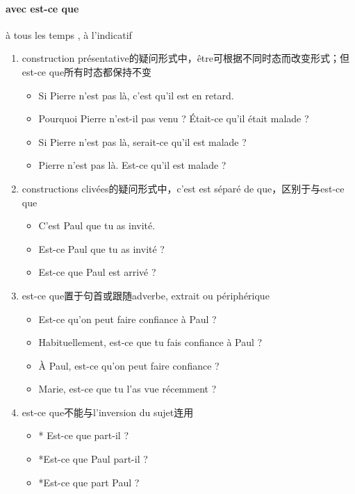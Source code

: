 \documentclass[UTF8]{report}
\begin{document}
\paragraph{avec est-ce que}
à tous les temps , à l’indicatif
\begin{enumerate}
    \item construction présentative的疑问形式中，être可根据不同时态而改变形式；但est-ce que所有时态都保持不变
    \begin{itemize}
        \item Si Pierre n’est pas là, c’est qu’il est en retard.
        \item  Pourquoi Pierre n’est-il pas venu ? Était-ce qu’il était malade ?
        \item Si Pierre n’est pas là, serait-ce qu’il est malade ?
        \item Pierre n’est pas là. Est-ce qu’il est malade ?
    \end{itemize}
    \item constructions clivées的疑问形式中，c’est est séparé de que，区别于与est-ce que
    \begin{itemize}
        \item C’est Paul que tu as invité.
        \item Est-ce Paul que tu as invité ?
        \item Est-ce que Paul est arrivé ?
    \end{itemize}
    \item est-ce que置于句首或跟随adverbe, extrait ou périphérique
    \begin{itemize}
        \item Est-ce qu’on peut faire confiance à Paul ?
        \item Habituellement, est-ce que tu fais confiance à Paul ?
        \item À Paul, est-ce qu’on peut faire confiance ?
        \item Marie, est-ce que tu l’as vue récemment ?
    \end{itemize}
    \item est-ce que不能与l’inversion du sujet连用
    \begin{itemize}
        \item * Est-ce que part-il ?
        \item *Est-ce que Paul part-il ?
        \item *Est-ce que part Paul ?
    \end{itemize}
\end{enumerate}
\end{document}
